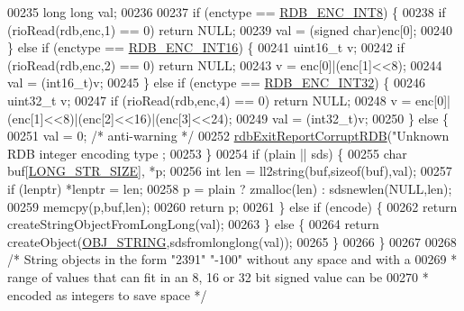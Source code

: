 \begin{DoxyCode}
{{{{00235     \textcolor{keywordtype}{long} \textcolor{keywordtype}{long} val;
00236 
00237     \textcolor{keywordflow}{if} (enctype == \hyperlink{rdb_8h_a56f2f16c5470043c643add1010823d23}{RDB\_ENC\_INT8}) \{
00238         \textcolor{keywordflow}{if} (rioRead(rdb,enc,1) == 0) \textcolor{keywordflow}{return} NULL;
00239         val = (\textcolor{keywordtype}{signed} \textcolor{keywordtype}{char})enc[0];
00240     \} \textcolor{keywordflow}{else} \textcolor{keywordflow}{if} (enctype == \hyperlink{rdb_8h_a79072da2d9fb562368f1798bdf8d7645}{RDB\_ENC\_INT16}) \{
00241         uint16\_t v;
00242         \textcolor{keywordflow}{if} (rioRead(rdb,enc,2) == 0) \textcolor{keywordflow}{return} NULL;
00243         v = enc[0]|(enc[1]<<8);
00244         val = (int16\_t)v;
00245     \} \textcolor{keywordflow}{else} \textcolor{keywordflow}{if} (enctype == \hyperlink{rdb_8h_ab74cba44dacad1f1f0d87dffba9efa98}{RDB\_ENC\_INT32}) \{
00246         uint32\_t v;
00247         \textcolor{keywordflow}{if} (rioRead(rdb,enc,4) == 0) \textcolor{keywordflow}{return} NULL;
00248         v = enc[0]|(enc[1]<<8)|(enc[2]<<16)|(enc[3]<<24);
00249         val = (int32\_t)v;
00250     \} \textcolor{keywordflow}{else} \{
00251         val = 0; \textcolor{comment}{/* anti-warning */}
00252         \hyperlink{rdb_8c_afb34e310c0e5dfd9f8c2bebbec59c7f7}{rdbExitReportCorruptRDB}(\textcolor{stringliteral}{"Unknown RDB integer encoding type %
      ;
00253     \}
00254     \textcolor{keywordflow}{if} (plain || sds) \{
00255         \textcolor{keywordtype}{char} buf[\hyperlink{server_8h_a39ec35278876f65fc1ef70b049856ca3}{LONG\_STR\_SIZE}], *p;
00256         \textcolor{keywordtype}{int} len = ll2string(buf,\textcolor{keyword}{sizeof}(buf),val);
00257         \textcolor{keywordflow}{if} (lenptr) *lenptr = len;
00258         p = plain ? zmalloc(len) : sdsnewlen(NULL,len);
00259         memcpy(p,buf,len);
00260         \textcolor{keywordflow}{return} p;
00261     \} \textcolor{keywordflow}{else} \textcolor{keywordflow}{if} (encode) \{
00262         \textcolor{keywordflow}{return} createStringObjectFromLongLong(val);
00263     \} \textcolor{keywordflow}{else} \{
00264         \textcolor{keywordflow}{return} createObject(\hyperlink{server_8h_a65236ea160f69cdef33ec942092af88f}{OBJ\_STRING},sdsfromlonglong(val));
00265     \}
00266 \}
00267 
00268 \textcolor{comment}{/* String objects in the form "2391" "-100" without any space and with a}
00269 \textcolor{comment}{ * range of values that can fit in an 8, 16 or 32 bit signed value can be}
00270 \textcolor{comment}{ * encoded as integers to save space */}
}}}}}
\end{DoxyCode}
